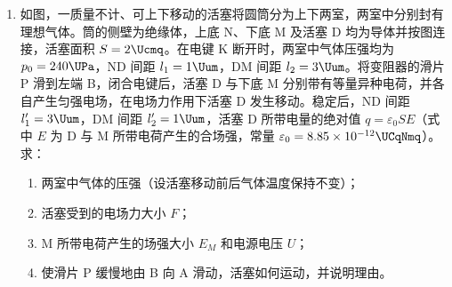\documentclass[\gkver]{gaokaozhenti}
\begin{document}
\begin{enumerate}
{$F = ma = 0.2\UN$。

金属棒运动 $0.5\Um$，框架中产生的焦耳热等于克服安培力做的功，故

$Q = Fs = 0.1\UJ$。

（2）金属棒所受安培力为

$F = BIL$，

又 $I = \frac{E}{R} = \frac{BLv}{R}$，

由牛顿第二定律得

$F = \frac{B^{2}L^{2}v}{R} = ma$，

由于棒做匀减速运动，有

$v = \sqrt{v_{0}^{2} - 2a(x_{0} - x)}$，

联立解得 $R = \frac{B^{2}L^{2}}{ma}\sqrt{v_{0}^{2} - 2a(x_{0} - x)} = 0.4\sqrt{x}$。

（3）错误之处是把 $0.4\Us$ 时回路内的电阻 $R$ 代入 $q = \frac{BLs}{R}$ 进行计算。

正确解法是：由电荷量的定义知

$q = It$，

又 $F = BIL = ma$，

联立解得 $q = \frac{mat}{BL} = 0.4\UC$。
}

\item
如图，一质量不计、可上下移动的活塞将圆筒分为上下两室，两室中分别封有理想气体。筒的侧壁为绝缘体，上底 N、下底 M 及活塞 D 均为导体并按图连接，活塞面积 $S = 2\Ucmq$。在电键 K 断开时，两室中气体压强均为 $p_{0} = 240\UPa$，ND 间距 $l_{1} = 1\Uum$，DM 间距 $l_{2} = 3\Uum$。将变阻器的滑片 P 滑到左端 B，闭合电键后，活塞 D 与下底 M 分别带有等量异种电荷，并各自产生匀强电场，在电场力作用下活塞 D 发生移动。稳定后，ND 间距 $l_{1}' = 3\Uum$，DM 间距 $l_{2}' = 1\Uum$，活塞 D 所带电量的绝对值 $q = \varepsilon_{0}SE$（式中 $E$ 为 D 与 M 所带电荷产生的合场强，常量 $\varepsilon_{0} = 8.85\times10^{-12}\UCqNmq$）。求：
\begin{enumerate}
	\item
	两室中气体的压强（设活塞移动前后气体温度保持不变）；
	\item
	活塞受到的电场力大小 $F$；
	\item
	M 所带电荷产生的场强大小 $E_{M}$ 和电源电压 $U$；
	\item
	使滑片 P 缓慢地由 B 向 A 滑动，活塞如何运动，并说明理由。
\end{enumerate}
\onepicture[align=right, w=5.95cm]{}
\end{enumerate}
\end{document}
